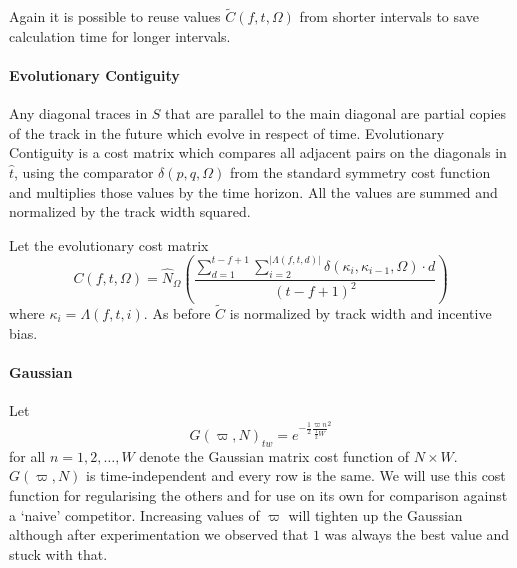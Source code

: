 \documentclass[twocolumn]{article}
\begin{document}


Again it is possible to reuse values $\tilde C(f,t,\Omega)$ from
shorter intervals to save calculation time for longer intervals.

	
	\paragraph{Evolutionary Contiguity}

	
	Any diagonal traces in $S$ that are parallel to the main diagonal are partial copies of the track in the future which evolve in respect of time. Evolutionary Contiguity is a cost matrix which compares all adjacent pairs on the diagonals in $\hat t$, using the comparator $\delta( p,q, \Omega )$ from the standard symmetry cost function and multiplies those values by the time horizon. All the values are summed and normalized by the track width squared. 
	
	Let the evolutionary cost matrix
	\begin{dmath*} C(f, t, \Omega) =  
		\hat N_\Omega\left(\frac{
		\sum_{d=1}^{t-f+1} 
		\sum_{i=2}^{|\Lambda( f,t,d )|}  \delta( \kappa_{i}, \kappa_{i-1}, \Omega ) \cdot d
	}{(t-f+1)^2}\right)
	\end{dmath*}  where  $\kappa_i=\Lambda( f,t,i )$. As before $\tilde C$ is normalized by track width and incentive bias.


	\paragraph{Gaussian}
	Let \[
	G( \varpi, N )_{tw} = e^{ - \frac{1}{2} \frac{\varpi n}{ \frac{1}{2} W}^2  }
	\] for all $n=1,2,\ldots,W$ denote the Gaussian matrix cost function of $N\times W$. $G( \varpi, N )$ is time-independent and every row is the same. We will use this cost function for regularising the others and for use on its own for comparison against a `naive' competitor. Increasing values of $\varpi$ will tighten up the Gaussian although after experimentation we observed that $1$ was always the best value and stuck with that.
	
\end{document}
